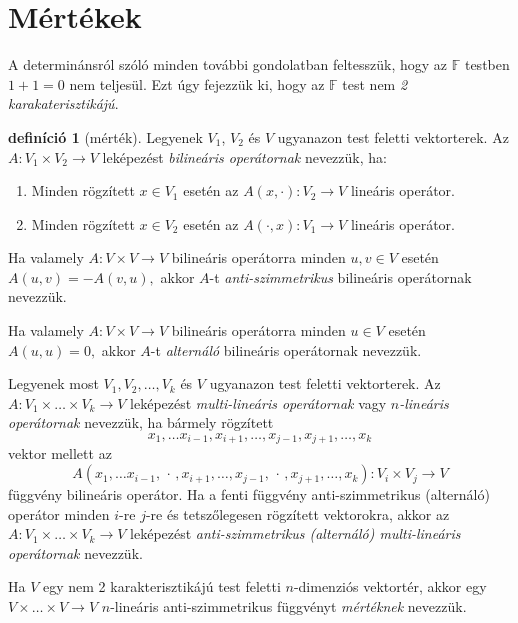 \documentclass[9pt, a4paper, showtrims]{memoir}
\theoremstyle{plain}
\theoremstyle{remark}
\theoremstyle{definition}
\newtheorem{definition}[proposition]{definíció}
\begin{document}
\section{Mértékek}
A determinánsról szóló minden további gondolatban feltesszük, 
hogy az $\mathbb{F}$ testben $1+1=0$ nem teljesül.
Ezt úgy fejezzük ki, hogy az $\mathbb{F}$ test nem \emph{2 karakaterisztikájú}.
\begin{definition}[mérték]
    Legyenek $V_{1}$, $V_{2}$ és $V$ ugyanazon test feletti vektorterek. 
    Az $A:V_{1}\times V_{2}\rightarrow V$ leképezést \emph{bilineáris operátornak}
    nevezzük, ha:
    \begin{enumerate}
        \item 
            Minden rögzített $x\in V_{1}$ esetén az $A\left( x,\cdot \right):V_{2}\rightarrow V$ lineáris operátor.
        \item 
            Minden rögzített $x\in V_{2}$ esetén az $A\left( \cdot ,x\right):V_{1}\rightarrow V$ lineáris operátor.
    \end{enumerate}

    Ha valamely $A:V\times V\rightarrow V$ bilineáris operátorra minden $u,v\in V$ esetén 
    \(
        A\left( u,v\right) =-A\left( v,u\right), 
    \)
    akkor $A$-t \emph{anti-szimmetrikus} bilineáris operátornak nevezzük.

    Ha valamely $A:V\times V\rightarrow V$ bilineáris operátorra minden $u\in V$ esetén 
    \(
        A\left( u,u\right) = 0,
    \)
    akkor $A$-t \emph{alternáló} bilineáris operátornak nevezzük.

    Legyenek most $V_{1},V_{2},\ldots ,V_{k}$ és $V$ ugyanazon test feletti vektorterek. 
    Az $A:V_{1}\times \ldots \times V_{k}\rightarrow V$ leképezést \emph{multi-lineáris operátornak} 
    vagy $n$\emph{-lineáris operátornak }nevezzük, 
    ha bármely rögzített 
    \[
        x_{1},\ldots x_{i-1},x_{i+1},\ldots ,x_{j-1},x_{j+1},\ldots ,x_{k}
    \]
    vektor mellett az 
    \[
        A\left( x_{1},\ldots x_{i-1},\,\cdot\, ,x_{i+1},\ldots ,x_{j-1},\,\cdot\, ,x_{j+1},\ldots ,x_{k}\right)
        :
        V_{i}\times V_{j}\rightarrow V
    \]
    függvény bilineáris operátor. 
    Ha a fenti függvény anti-szimmetrikus (alternáló) operátor minden $i$-re $j$-re és tetszőlegesen rögzített vektorokra, 
    akkor az 
    $A:V_{1}\times \ldots \times V_{k}\rightarrow V$ 
    leképezést \emph{anti-szimmetrikus (alternáló) multi-lineáris operátornak} nevezzük.

    Ha $V$ egy nem 2 karakterisztikájú test feletti $n$-dimenziós vektortér, akkor egy 
    $V\times \dots \times V\to V$ $n$-lineáris anti-szimmetrikus függvényt \emph{mértéknek} nevezzük.
\end{definition}
\end{document}
